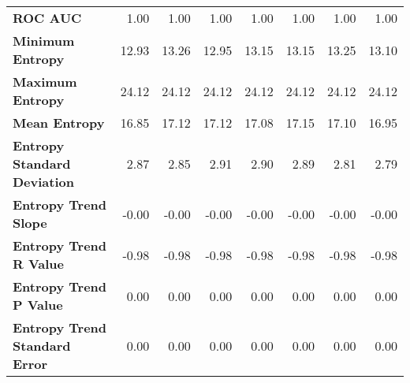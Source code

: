 \begin{tabular}{lrrrrrrr}
\textbf{ROC AUC} & 1.00 & 1.00 & 1.00 & 1.00 & 1.00 & 1.00 & 1.00 \\
\textbf{Minimum Entropy} & 12.93 & 13.26 & 12.95 & 13.15 & 13.15 & 13.25 & 13.10 \\
\textbf{Maximum Entropy} & 24.12 & 24.12 & 24.12 & 24.12 & 24.12 & 24.12 & 24.12 \\
\textbf{Mean Entropy} & 16.85 & 17.12 & 17.12 & 17.08 & 17.15 & 17.10 & 16.95 \\
\textbf{Entropy Standard Deviation} & 2.87 & 2.85 & 2.91 & 2.90 & 2.89 & 2.81 & 2.79 \\
\textbf{Entropy Trend Slope} & -0.00 & -0.00 & -0.00 & -0.00 & -0.00 & -0.00 & -0.00 \\
\textbf{Entropy Trend R Value} & -0.98 & -0.98 & -0.98 & -0.98 & -0.98 & -0.98 & -0.98 \\
\textbf{Entropy Trend P Value} & 0.00 & 0.00 & 0.00 & 0.00 & 0.00 & 0.00 & 0.00 \\
\textbf{Entropy Trend Standard Error} & 0.00 & 0.00 & 0.00 & 0.00 & 0.00 & 0.00 & 0.00 \\
\bottomrule
\end{tabular}
